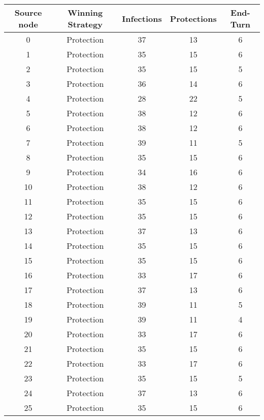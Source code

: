 \documentclass[results.tex]{subfiles}
\begin{document}
\begin{center}
  \begin{tabular}{| c || c | c | c | c |}
    \hline
    {\bfseries Source node} & {\bfseries Winning Strategy} & {\bfseries Infections} & {\bfseries Protections} & {\bfseries End-Turn} \\  %
    \hline\hline
    0 & Protection & 37 & 13 & 6 \\ 
    \hline
    1 & Protection & 35 & 15 & 6 \\ 
    \hline
    2 & Protection & 35 & 15 & 5 \\ 
    \hline
    3 & Protection & 36 & 14 & 6 \\ 
    \hline
    4 & Protection & 28 & 22 & 5 \\ 
    \hline
    5 & Protection & 38 & 12 & 6 \\ 
    \hline
    6 & Protection & 38 & 12 & 6 \\ 
    \hline
    7 & Protection & 39 & 11 & 5 \\ 
    \hline
    8 & Protection & 35 & 15 & 6 \\ 
    \hline
    9 & Protection & 34 & 16 & 6 \\ 
    \hline
    10 & Protection & 38 & 12 & 6 \\ 
    \hline
    11 & Protection & 35 & 15 & 6 \\ 
    \hline
    12 & Protection & 35 & 15 & 6 \\ 
    \hline
    13 & Protection & 37 & 13 & 6 \\ 
    \hline
    14 & Protection & 35 & 15 & 6 \\ 
    \hline
    15 & Protection & 35 & 15 & 6 \\ 
    \hline
    16 & Protection & 33 & 17 & 6 \\ 
    \hline
    17 & Protection & 37 & 13 & 6 \\ 
    \hline
    18 & Protection & 39 & 11 & 5 \\ 
    \hline
    19 & Protection & 39 & 11 & 4 \\ 
    \hline
    20 & Protection & 33 & 17 & 6 \\ 
    \hline
    21 & Protection & 35 & 15 & 6 \\ 
    \hline
    22 & Protection & 33 & 17 & 6 \\ 
    \hline
    23 & Protection & 35 & 15 & 5 \\ 
    \hline
    24 & Protection & 37 & 13 & 6 \\ 
    \hline
    25 & Protection & 35 & 15 & 6 \\ 

\end{tabular}
\end{center}
\end{document}

